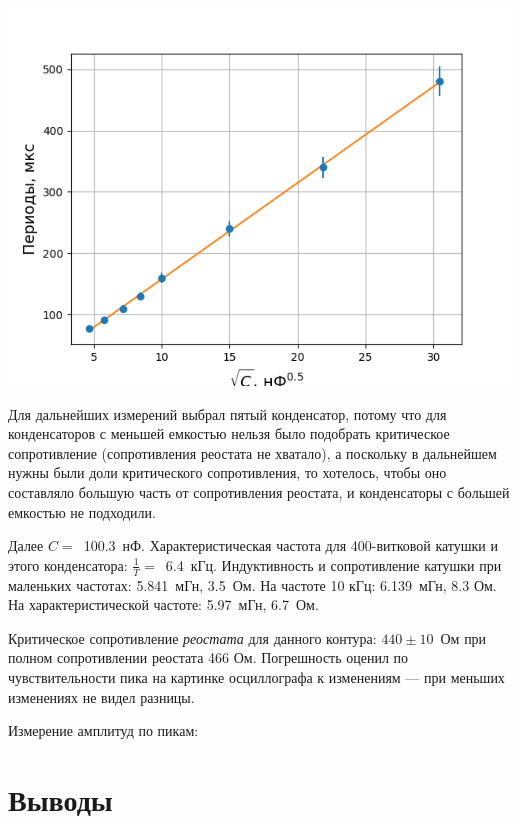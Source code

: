 \documentclass[a4paper, 12pt]{article}
\begin{document}
\begin{center}
\includegraphics[width=0.5\linewidth]{check_periods.png}
\end{center}

Для дальнейших измерений выбрал пятый конденсатор, потому что для конденсаторов с меньшей емкостью нельзя было подобрать критическое сопротивление (сопротивления реостата не хватало), а поскольку в дальнейшем нужны были доли критического сопротивления, то хотелось, чтобы оно составляло большую часть от сопротивления реостата, и конденсаторы с большей емкостью не подходили.

Далее $C =$~100.3~нФ.
Характеристическая частота для 400-витковой катушки и этого конденсатора: $\frac{1}{T} =$~6.4~кГц.
Индуктивность и сопротивление катушки при маленьких частотах: 5.841~мГн, 3.5~Ом.
На частоте 10 кГц: 6.139~мГн, 8.3 Ом.
На характеристической частоте: 5.97~мГн, 6.7~Ом.

Критическое сопротивление \emph{реостата} для данного контура: $440 \pm 10$~Ом при полном сопротивлении реостата 466 Ом.
Погрешность оценил по чувствительности пика на картинке осциллографа к изменениям --- при меньших изменениях не видел разницы.

Измерение амплитуд по пикам:

\section{Выводы}
\end{document}
